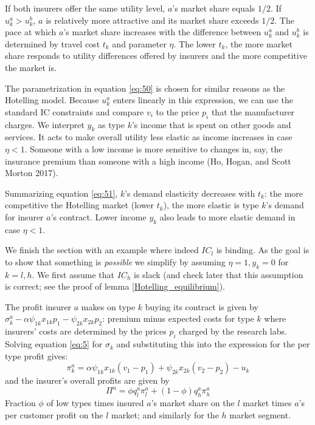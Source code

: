 \documentclass[a4paper,12pt]{article}
\makeatletter
\newcommand{\citeprocitem}[2]{\hyper@linkstart{cite}{citeproc_bib_item_#1}#2\hyper@linkend}
\makeatother
\begin{document}
If both insurers offer the same utility level, \(a\)'s market share equals \(1/2\). If \(u^a_k > u^b_k\), \(a\) is relatively more attractive and its market share exceeds \(1/2\). The pace at which \(a\)'s market share increases with the difference between \(u_k^a\) and \(u_k^b\) is determined by travel cost \(t_k\) and parameter \(\eta\). The lower \(t_k\), the more market share responds to utility differences offered by insurers and the more competitive the market is.

The parametrization in equation \eqref{eq:50} is chosen for similar reasons as the Hotelling model. Because \(u_k^a\) enters linearly in this expression, we can use the standard IC constraints and compare \(v_i\) to the price \(p_i\) that the manufacturer charges. We interpret \(y_k\) as type \(k\)'s income that is spent on other goods and services. It acts to make overall utility less elastic as income increases in case \(\eta<1\). Someone with a low income is more sensitive to changes in, say, the insurance premium than someone with a high income (\citeprocitem{22}{Ho, Hogan, and Scott Morton 2017}).

Summarizing equation \eqref{eq:51}, \(k\)'s demand elasticity decreases with \(t_k\): the more competitive the Hotelling market (lower \(t_k\)), the more elastic is type \(k\)'s demand for insurer \(a\)'s contract. Lower income \(y_k\) also leads to more elastic demand in case \(\eta<1\).

We finish the section with an example where indeed \(IC_l\) is binding. As the goal is to show that something is \emph{possible} we simplify by assuming \(\eta=1,y_k=0\) for \(k=l,h\). We first assume that \(IC_h\) is slack (and check later that this assumption is correct; see the proof of lemma \ref{Hotelling_equilibrium}).

The profit insurer \(a\) makes on type \(k\) buying its contract is given by \(\sigma_k^{a} - \alpha\psi_{1k}x_{1k}p_1 - \psi_{2k}x_{2k}p_2\): premium minus expected costs for type \(k\) where insurers' costs are determined by the prices \(p_{i}\) charged by the research labs. Solving equation \eqref{eq:5} for \(\sigma_{k}\) and substituting this into the expression for the per type profit gives:
\begin{equation}
\label{eq:6}
\pi_k^a = \alpha\psi_{1k}x_{1k}(v_1-p_1)+\psi_{2k}x_{2k}(v_2-p_2)-u_k
\end{equation}
and the insurer's overall profits are given by
\begin{equation}
\label{eq:7}
\Pi^a = \phi q_l^a \pi_l^{a} +(1-\phi)q_h^a\pi_h^{a}
\end{equation}
Fraction \(\phi\) of low types times insured \(a\)'s market share on the \(l\) market times \(a\)'s per customer profit on the \(l\) market; and similarly for the \(h\) market segment.
\end{document}
